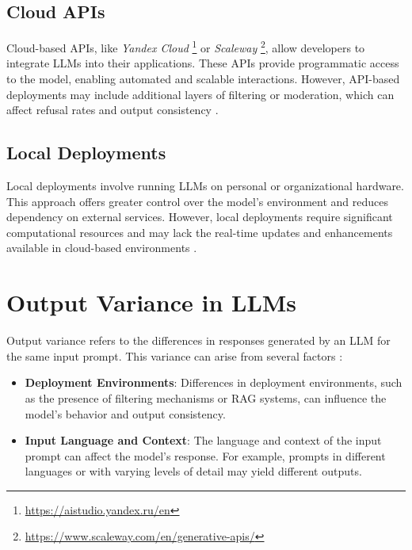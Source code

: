 \subsection{Cloud APIs}

Cloud-based APIs, like \textit{Yandex Cloud} \footnote{\url{https://aistudio.yandex.ru/en}} or \textit{Scaleway} \footnote{\url{https://www.scaleway.com/en/generative-apis/}}, allow developers to integrate LLMs into their applications. These APIs provide programmatic access to the model, enabling automated and scalable interactions. However, API-based deployments may include additional layers of filtering or moderation, which can affect refusal rates and output consistency \autocite{lipphardtDualStandardsExamining2026}.

\subsection{Local Deployments}

Local deployments involve running LLMs on personal or organizational hardware. This approach offers greater control over the model's environment and reduces dependency on external services. However, local deployments require significant computational resources and may lack the real-time updates and enhancements available in cloud-based environments \autocite{sandriniCloudAssessingBenefits2025}.

\section{Output Variance in LLMs}

Output variance refers to the differences in responses generated by an LLM for the same input prompt. This variance can arise from several factors \autocite{cuiSamePromptDifferent2026,lewisRetrievalaugmentedGenerationKnowledgeintensive2020}:

\begin{itemize}
	\item \textbf{Deployment Environments}: Differences in deployment environments, such as the presence of filtering mechanisms or RAG systems, can influence the model's behavior and output consistency.
	\item \textbf{Input Language and Context}: The language and context of the input prompt can affect the model's response. For example, prompts in different languages or with varying levels of detail may yield different outputs.
\end{itemize}


